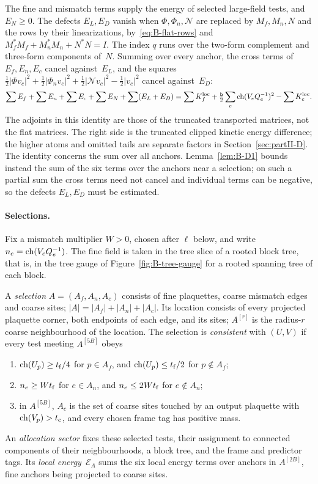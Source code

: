 The fine and mismatch terms supply the energy of selected large-field tests, and $E_N\ge0$. The defects $E_L,E_D$ vanish when $\Phi,\Phi_n,\mathcal N$ are replaced by $M_f,M_n,N$ and the rows by their linearizations, by~\eqref{eq:B-flat-rows} and $M_f^*M_f+M_n^*M_n+N^*N=I$. The index $q$ runs over the two-form complement and three-form components of~$N$. Summing over every anchor, the cross terms of $E_f,E_n,E_c$ cancel against~$E_L$, and the squares $\frac12|\Phi v_c|^2+\frac12|\Phi_nv_c|^2+\frac12|\mathcal Nv_c|^2-\frac12|v_c|^2$ cancel against~$E_D$:
\begin{equation}\label{eq:B-global-rows}
\sum E_f+\sum E_n+\sum E_c+\sum E_N+\sum(E_L+E_D)
=\sum K^{\rm loc}_f+\tfrac{\mathsf{b}}2\sum_e\operatorname{ch}(V_eQ_e^{-1})^2-\sum K^{\rm loc}_c.
\end{equation}
The adjoints in this identity are those of the truncated transported matrices, not the flat matrices. The right side is the truncated clipped kinetic energy difference; the higher atoms and omitted tails are separate factors in Section~\ref{sec:partII-D}. The identity concerns the sum over all anchors. Lemma~\ref{lem:B-D1} bounds instead the sum of the six terms over the anchors near a selection; on such a partial sum the cross terms need not cancel and individual terms can be negative, so the defects $E_L,E_D$ must be estimated.

\paragraph{Selections.} Fix a mismatch multiplier $W>0$, chosen after $\ell$ below, and write $n_e=\operatorname{ch}(V_eQ_e^{-1})$. The fine field is taken in the tree slice of a rooted block tree, that is, in the tree gauge of Figure~\ref{fig:B-tree-gauge} for a rooted spanning tree of each block.
\begin{definition}\label{def:B-selection}
A \emph{selection} $A=(A_f,A_n,A_c)$ consists of fine plaquettes, coarse mismatch edges and coarse sites; $|A|=|A_f|+|A_n|+|A_c|$. Its location consists of every projected plaquette corner, both endpoints of each edge, and its sites; $A^{[r]}$ is the radius-$r$ coarse neighbourhood of the location. The selection is \emph{consistent} with $(U,V)$ if every test meeting $A^{[5B]}$ obeys
\begin{enumerate}[label=(\roman*)]
\item $\operatorname{ch}(U_p)\ge t_{\rm f}/4$ for $p\in A_f$, and $\operatorname{ch}(U_p)\le t_{\rm f}/2$ for $p\notin A_f$;
\item $n_e\ge Wt_{\rm f}$ for $e\in A_n$, and $n_e\le2Wt_{\rm f}$ for $e\notin A_n$;
\item in $A^{[5B]}$, $A_c$ is the set of coarse sites touched by an output plaquette with $\operatorname{ch}(V_p)>t_{\rm c}$, and every chosen frame tag has positive mass.
\end{enumerate}
An \emph{allocation sector} fixes these selected tests, their assignment to connected components of their neighbourhoods, a block tree, and the frame and predictor tags. Its \emph{local energy}~$\mathcal E_A$ sums the six local energy terms over anchors in $A^{[2B]}$, fine anchors being projected to coarse sites.
\end{definition}

